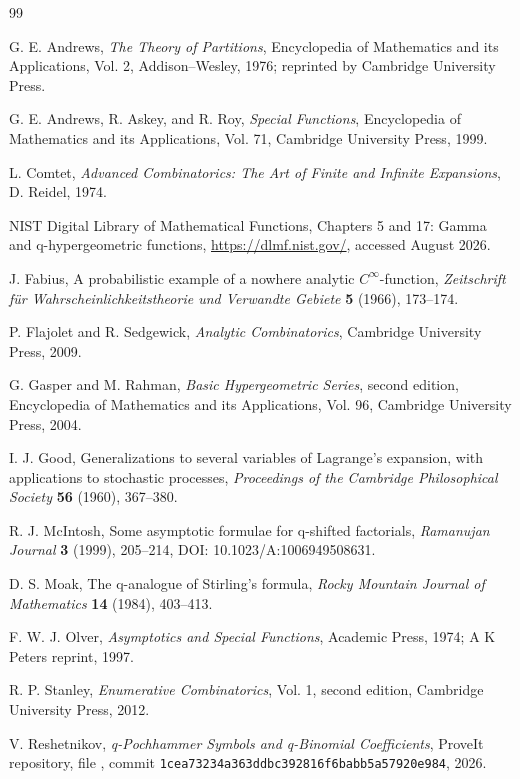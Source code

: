 \documentclass[11pt,letterpaper,oneside,openany]{book}
\theoremstyle{definition}
\theoremstyle{remark}
\begin{document}
\begin{thebibliography}{99}

G. E. Andrews,
\emph{The Theory of Partitions},
Encyclopedia of Mathematics and its Applications, Vol. 2,
Addison--Wesley, 1976; reprinted by Cambridge University Press.

G. E. Andrews, R. Askey, and R. Roy,
\emph{Special Functions},
Encyclopedia of Mathematics and its Applications, Vol. 71,
Cambridge University Press, 1999.

L. Comtet,
\emph{Advanced Combinatorics: The Art of Finite and Infinite Expansions},
D. Reidel, 1974.

NIST Digital Library of Mathematical Functions,
Chapters 5 and 17: Gamma and q-hypergeometric functions,
\url{https://dlmf.nist.gov/}, accessed August 2026.

J. Fabius,
A probabilistic example of a nowhere analytic \(C^\infty\)-function,
\emph{Zeitschrift f\"ur Wahrscheinlichkeitstheorie und Verwandte Gebiete}
\textbf{5} (1966), 173--174.

P. Flajolet and R. Sedgewick,
\emph{Analytic Combinatorics},
Cambridge University Press, 2009.

G. Gasper and M. Rahman,
\emph{Basic Hypergeometric Series}, second edition,
Encyclopedia of Mathematics and its Applications, Vol. 96,
Cambridge University Press, 2004.

I. J. Good,
Generalizations to several variables of Lagrange's expansion, with applications
to stochastic processes,
\emph{Proceedings of the Cambridge Philosophical Society}
\textbf{56} (1960), 367--380.

R. J. McIntosh,
Some asymptotic formulae for q-shifted factorials,
\emph{Ramanujan Journal} \textbf{3} (1999), 205--214,
DOI: 10.1023/A:1006949508631.

D. S. Moak,
The q-analogue of Stirling's formula,
\emph{Rocky Mountain Journal of Mathematics} \textbf{14} (1984), 403--413.

F. W. J. Olver,
\emph{Asymptotics and Special Functions},
Academic Press, 1974; A K Peters reprint, 1997.

R. P. Stanley,
\emph{Enumerative Combinatorics}, Vol. 1, second edition,
Cambridge University Press, 2012.

V. Reshetnikov,
\emph{q-Pochhammer Symbols and q-Binomial Coefficients},
ProveIt repository, file
,
commit \nolinkurl{1cea73234a363ddbc392816f6babb5a57920e984}, 2026.


\end{thebibliography}
\end{document}

